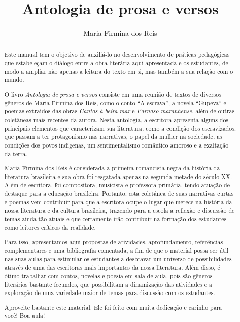 \documentclass[12pt]{extarticle}
\begin{document}
\newcommand{\AutorLivro}{Maria Firmina dos Reis}
\newcommand{\TituloLivro}{Antologia de prosa e versos}
\newcommand{\Tema}{Ficção, mistério e fantasia}
\newcommand{\Genero}{Conto; crônica, novela e poema}
\newcommand{\imagemCapa}{./images/PNLD0014-01.png}
\newcommand{\issnppub}{---}
\newcommand{\issnepub}{---}
\newcommand{\colaborador}{\textbf{Rodrigo Jorge Ribeiro Neves}}


\title{\TituloLivro}
\author{\AutorLivro}
\def\authornotes{\colaborador}

\date{}
\maketitle


\begin{abstract}

Este manual tem o objetivo de auxiliá-lo no desenvolvimento de práticas
pedagógicas que estabeleçam o diálogo entre a obra literária aqui
apresentada e os estudantes, de modo a ampliar não apenas a leitura do
texto em si, mas também a sua relação com o mundo.

O livro \emph{Antologia de prosa e versos} consiste em uma reunião de
textos de diversos gêneros de Maria Firmina dos Reis, como o conto ``A
escrava'', a novela ``Gupeva'' e poemas extraídos das obras \emph{Cantos
à beira-mar} e \emph{Parnaso maranhense}, além de outras coletâneas mais
recentes da autora. Nesta antologia, a escritora apresenta alguns dos
principais elementos que caracterizam sua literatura, como a condição
dos escravizados, que passam a ter protagonismo nas narrativas, o papel
da mulher na sociedade, as condições dos povos indígenas, um
sentimentalismo romântico amoroso e a exaltação da terra.

Maria Firmina dos Reis é considerada a primeira romancista negra da
história da literatura brasileira e sua obra foi resgatada apenas na
segunda metade do século XX. Além de escritora, foi compositora,
musicista e professora primária, tendo atuação de destaque para a
educação brasileira. Portanto, esta coletânea de suas narrativas curtas
e poemas vem contribuir para que a escritora ocupe o lugar que merece na
história da nossa literatura e da cultura brasileira, trazendo para a
escola a reflexão e discussão de temas ainda tão atuais e que certamente
irão contribuir na formação dos estudantes como leitores críticos da
realidade.

Para isso, apresentamos aqui propostas de atividades, aprofundamento,
referências complementares e uma bibliografia comentada, a fim de que o
material possa ser útil nas suas aulas para estimular os estudantes a
desbravar um universo de possibilidades através de uma das escritoras
mais importantes da nossa literatura. Além disso, é ótimo trabalhar com
contos, novelas e poesia em sala de aula, pois são gêneros literários
bastante fecundos, que possibilitam a dinamização das atividades e a
exploração de uma variedade maior de temas para discussão com os
estudantes.

Aproveite bastante este material. Ele foi feito com muita dedicação e
carinho para você! Boa aula!
\end{abstract}
\end{document}
